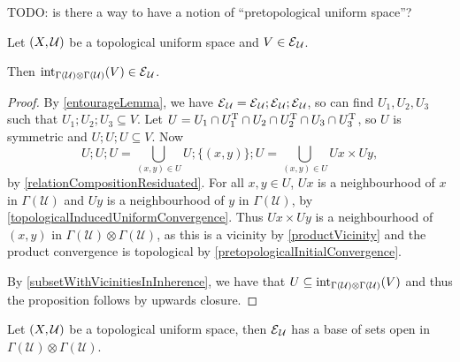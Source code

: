 TODO: is there a way to have a notion of ``pretopological uniform space''?

\begin{proposition}
Let $\sSet{X,\mathcal{U}}$ be a topological uniform space and $V\in \operatorname{\mathcal{E}}_\mathcal{U}$.

Then $\operatorname{int}_{\Gamma(\mathcal{U})\otimes \Gamma(\mathcal{U})}(V) \in \operatorname{\mathcal{E}}_\mathcal{U}$.
\end{proposition}
\begin{proof}
By \ref{entourageLemma}, we have $\operatorname{\mathcal{E}}_\mathcal{U} = \operatorname{\mathcal{E}}_\mathcal{U};\operatorname{\mathcal{E}}_\mathcal{U};\operatorname{\mathcal{E}}_\mathcal{U}$, so can find $U_1,U_2,U_3$ such that $U_1;U_2;U_3 \subseteq V$. Let $U = U_1\cap U_1^{\mathrm{T}} \cap U_2 \cap U_2^{\mathrm{T}} \cap U_3\cap U_3^{\mathrm{T}}$, so $U$ is symmetric and $U;U;U\subseteq V$.
Now
\[ U;U;U = \bigcup_{(x,y)\in U}U;\{(x, y)\};U = \bigcup_{(x,y)\in U}Ux \times Uy, \]
by \ref{relationCompositionResiduated}. For all $x,y\in U$, $Ux$ is a neighbourhood of $x$ in $\Gamma(\mathcal{U})$ and $Uy$ is a neighbourhood of $y$ in $\Gamma(\mathcal{U})$, by \ref{topologicalInducedUniformConvergence}.  Thus $Ux \times Uy$ is a neighbourhood of $(x,y)$ in $\Gamma(\mathcal{U})\otimes \Gamma(\mathcal{U})$, as this is a vicinity by \ref{productVicinity} and the product convergence is topological by \ref{pretopologicalInitialConvergence}.

By \ref{subsetWithVicinitiesInInherence}, we have that $U\subseteq \operatorname{int}_{\Gamma(\mathcal{U})\otimes \Gamma(\mathcal{U})}(V)$ and thus the proposition follows by upwards closure.
\end{proof}
\begin{corollary} \label{entourageOpenBase}
Let $\sSet{X,\mathcal{U}}$ be a topological uniform space, then $\operatorname{\mathcal{E}}_\mathcal{U}$ has a base of sets open in $\Gamma(\mathcal{U})\otimes \Gamma(\mathcal{U})$.
\end{corollary}

